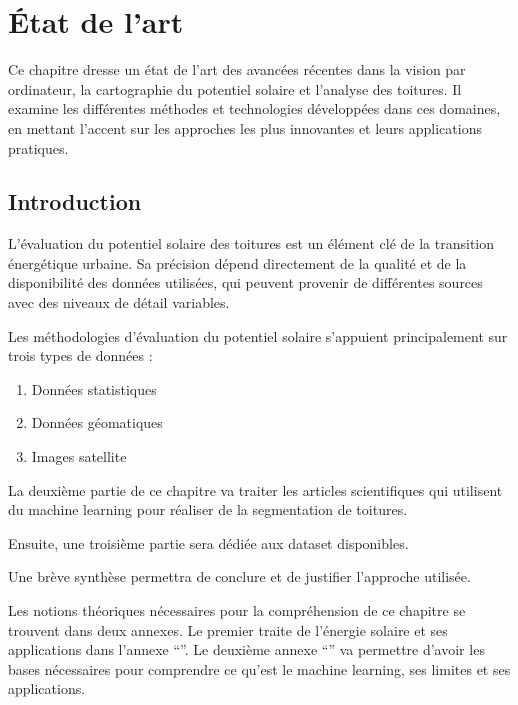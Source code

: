 
\chapter{État de l'art}
\label{chap:analysis}

Ce chapitre dresse un état de l'art des avancées récentes dans la vision par ordinateur, la cartographie du potentiel solaire et l'analyse des toitures. Il examine les différentes méthodes et technologies développées dans ces domaines, en mettant l'accent sur les approches les plus innovantes et leurs applications pratiques.

\localtableofcontents

\newpage

\section{Introduction}
\par{L'évaluation du potentiel solaire des toitures est un élément clé de la transition énergétique urbaine. Sa précision dépend directement de la qualité et de la disponibilité des données utilisées, qui peuvent provenir de différentes sources avec des niveaux de détail variables.}

\par{Les méthodologies d'évaluation du potentiel solaire s'appuient principalement sur trois types de données :}
\begin{enumerate}
    \item Données statistiques
    \item Données géomatiques
    \item Images satellite
\end{enumerate}

\par{La deuxième partie de ce chapitre va traiter les articles scientifiques qui utilisent du machine learning pour réaliser de la segmentation de toitures.}

\par{Ensuite, une troisième partie sera dédiée aux dataset disponibles.}

\par{Une brève synthèse permettra de conclure et de justifier l'approche utilisée.}

\par{Les notions théoriques nécessaires pour la compréhension de ce chapitre se trouvent dans deux annexes. Le premier traite de  l'énergie solaire et ses applications dans l'annexe ``''. Le deuxième annexe ``'' va permettre d’avoir les bases nécessaires pour comprendre ce qu’est le machine learning, ses
limites et ses applications.}

